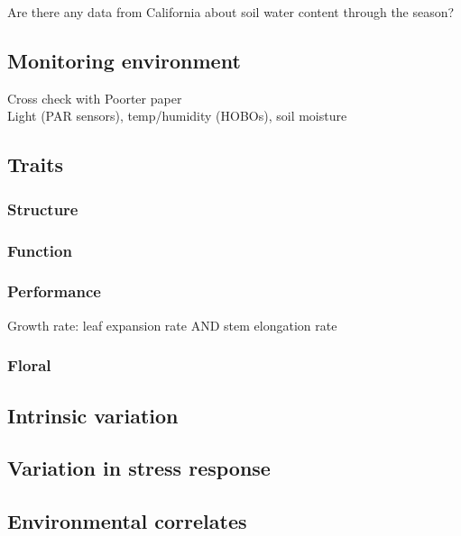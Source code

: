 \documentclass[11pt, oneside]{article}
\begin{document}
			Are there any data from California about soil water content through the season?

\subsection*{Monitoring environment}

		Cross check with Poorter paper \\
		Light (PAR sensors), temp/humidity (HOBOs), soil moisture

\subsection*{Traits}

\subsubsection*{Structure}
\subsubsection*{Function}
\subsubsection*{Performance}

Growth rate: leaf expansion rate AND stem elongation rate

\subsubsection*{Floral}

\subsection*{Intrinsic variation}
\subsection*{Variation in stress response} %

\subsection*{Environmental correlates}
\end{document}
